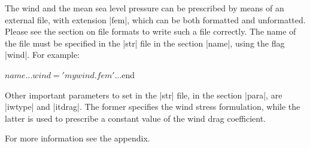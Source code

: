 
%
%
%
%
%
%
%

The wind and the mean sea level pressure can be prescribed by means of
an external file, with extension |fem|, which can be both formatted
and unformatted. Please see the section on file formats to write such a
file correctly.  The name of the file must be specified in the |str|
file in the section |name|, using the flag |wind|. For example:

\begin{code}
$name
...
wind = 'mywind.fem'
...
$end
\end{code}

Other important parameters to set in the |str| file, in the section
|para|, are |iwtype| and |itdrag|. The former specifies the wind stress
formulation, while the latter is used to prescribe a constant value of
the wind drag coefficient.

For more information see the appendix.

